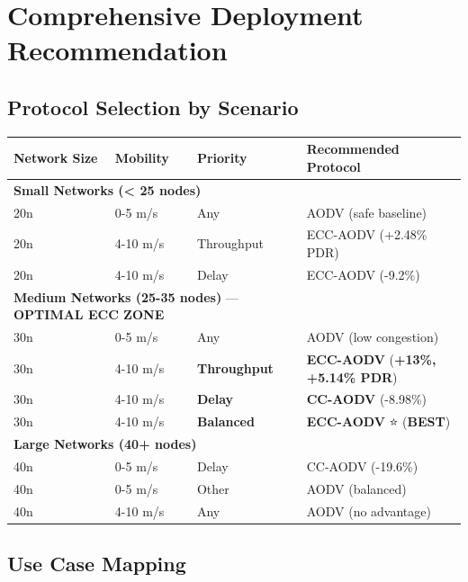 \documentclass[12pt]{article}
\begin{document}
\section*{Comprehensive Deployment Recommendation}

\subsection*{Protocol Selection by Scenario}

\begin{center}
\begin{tabular}{lll|l}
\toprule
\textbf{Network Size} & \textbf{Mobility} & \textbf{Priority} & \textbf{Recommended Protocol} \\
\midrule
\multicolumn{3}{l|}{\textbf{Small Networks (< 25 nodes)}} \\
\midrule
20n & 0-5 m/s & Any & AODV (safe baseline) \\
20n & 4-10 m/s & Throughput & ECC-AODV (+2.48\% PDR) \\
20n & 4-10 m/s & Delay & ECC-AODV (-9.2\%) \\
\midrule
\multicolumn{3}{l|}{\textbf{Medium Networks (25-35 nodes)} — \textbf{OPTIMAL ECC ZONE}} \\
\midrule
30n & 0-5 m/s & Any & AODV (low congestion) \\
30n & 4-10 m/s & \textbf{Throughput} & \textbf{ECC-AODV} (\textbf{+13\%, +5.14\% PDR}) \\
30n & 4-10 m/s & \textbf{Delay} & \textbf{CC-AODV} (-8.98\%) \\
30n & 4-10 m/s & \textbf{Balanced} & \textbf{ECC-AODV} ⭐ (\textbf{BEST}) \\
\midrule
\multicolumn{3}{l|}{\textbf{Large Networks (40+ nodes)}} \\
\midrule
40n & 0-5 m/s & Delay & CC-AODV (-19.6\%) \\
40n & 0-5 m/s & Other & AODV (balanced) \\
40n & 4-10 m/s & Any & AODV (no advantage) \\
\bottomrule
\end{tabular}
\end{center}

\subsection*{Use Case Mapping}
\end{document}

